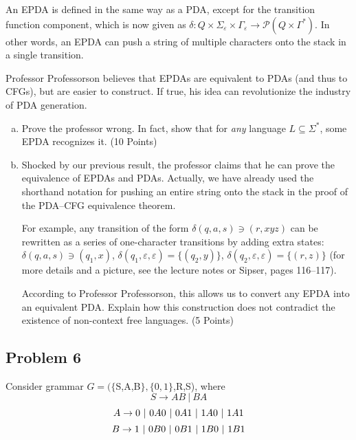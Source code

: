 \documentclass{article}
\begin{document}
        An EPDA is defined in the same way as a PDA, except for the transition function component, which is now given as $\delta: Q\times\Sigma_\varepsilon\times\Gamma_\varepsilon\to\mathcal{P}(Q\times\Gamma^*)$. In other words, an EPDA can push a string of multiple characters onto the stack in a single transition. 
        
        Professor Professorson believes that EPDAs are equivalent to PDAs (and thus to CFGs), but are easier to construct. If true, his idea can revolutionize the industry of PDA generation.
        \begin{enumerate}[(a)]
    \item Prove the professor wrong. In fact, show that for \textit{any} language $L\subseteq\Sigma^*$,
            some EPDA recognizes it. (10 Points)
    \item Shocked by our previous result, the professor claims that he can prove the equivalence of EPDAs and PDAs.
    Actually, we have already used the shorthand notation for pushing an entire string onto the stack in the proof of
    the PDA--CFG equivalence theorem. 

            For example, any transition of the form $\delta(q,a,s)\ni(r,xyz)$ can be rewritten as a series of one-character transitions by adding extra states: $\delta(q,a,s)\ni(q_1,x)$, $\delta(q_1,\varepsilon,\varepsilon)=\{(q_2,y)\}$, $\delta(q_2,\varepsilon,\varepsilon)=\{(r,z)\}$ (for more details and a picture, see the lecture notes or Sipser, pages 116--117).
            
            According to Professor Professorson, this allows us to convert any EPDA into an equivalent PDA. Explain how this construction does not contradict the existence of non-context free languages. (5 Points)
\end{enumerate}

\newpage


\subsection*{Problem 6}
Consider grammar $G = (\{$S,A,B$\},\{0,1\}$,R,S), where
\[
    S \rightarrow AB\ |\ BA
\]
\[
    A \rightarrow 0\ |\ 0A0\ |\ 0A1\ |\ 1A0\ |\ 1A1 \\
\]
\[
    B \rightarrow 1\ |\ 0B0\ |\ 0B1\ |\ 1B0\ |\ 1B1 \\
\]
\end{document}
